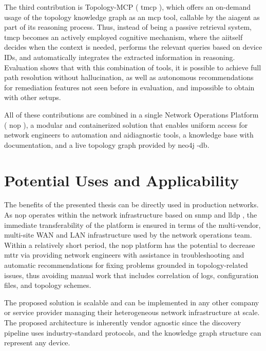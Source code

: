 \documentclass[11pt,a4paper]{report}
\begin{document}
The third contribution is Topology-MCP ( \gls{tmcp} ), which offers an on-demand usage of the topology knowledge graph as an \gls{mcp}  tool, callable by the \gls{ai}agent as part of its reasoning process. Thus, instead of being a passive retrieval system,  \gls{tmcp}  becomes an actively employed cognitive mechanism, where the \gls{ai}itself decides when the context is needed, performs the relevant queries based on device IDs, and automatically integrates the extracted information in reasoning. Evaluation shows that with this combination of tools, it is possible to achieve full path resolution without \gls{hallucination}, as well as autonomous recommendations for remediation features not seen before in evaluation, and impossible to obtain with other setups.

All of these contributions are combined in a single Network Operations Platform ( \gls{nop} ), a modular and containerized solution that enables uniform access for network engineers to automation and \gls{ai}diagnostic tools, a knowledge base with documentation, and a live topology graph provided by  \gls{neo4j} -db.

\section{Potential Uses and Applicability}

The benefits of the presented thesis can be directly used in production networks. As  \gls{nop}  operates within the network infrastructure based on \gls{snmp} and \gls{lldp} , the immediate transferability of the platform is ensured in terms of the multi-vendor, multi-site WAN and LAN infrastructure used by the network operations team. Within a relatively short period, the  \gls{nop}  platform has the potential to decrease  \gls{mttr}  via providing network engineers with assistance in troubleshooting and automatic recommendations for fixing problems grounded in topology-related issues, thus avoiding manual work that includes correlation of logs, configuration files, and \gls{topology} schemes.


The proposed solution is scalable and can be implemented in any other company or service provider managing their heterogeneous network infrastructure at scale. The proposed architecture is inherently vendor agnostic since the discovery pipeline uses industry-standard protocols, and the knowledge graph structure can represent any device.
\end{document}
